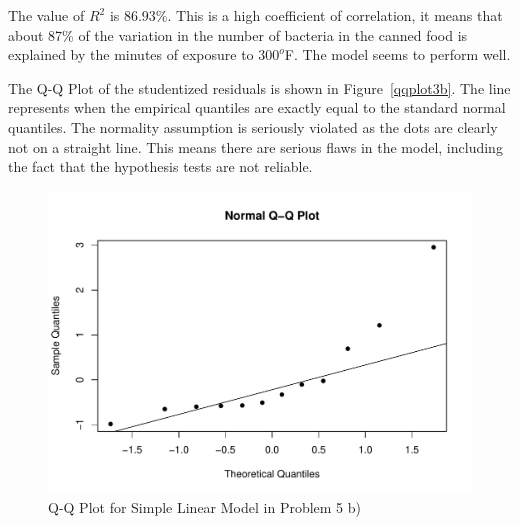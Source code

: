 \begin{solution}{2.22}
\begin{enumerate}
The value of $R^{2}$ is $86.93\%$. This is a high coefficient of correlation, it means that about 87\% of the variation in the number of bacteria in the canned food is explained by the minutes of exposure to $300^{o}$F. The model seems to perform well.

The Q-Q Plot of the studentized residuals is shown in Figure~\ref{qqplot3b}. The line represents when the empirical quantiles are exactly equal to the standard normal quantiles. The normality assumption is seriously violated as the dots are clearly not on a straight line. This means there are serious flaws in the model, including the fact that the hypothesis tests are not reliable.

\begin{figure}
\begin{center}
\begin{knitrout}
\color{fgcolor}
\includegraphics[width=\maxwidth]{figure/unnamed-chunk-39-1}

\end{knitrout}
\end{center}
\caption{Q-Q Plot for Simple Linear Model in Problem 5 b)}
\label{fig:simple:bact2}
\end{figure}


\end{enumerate}
\end{solution}

